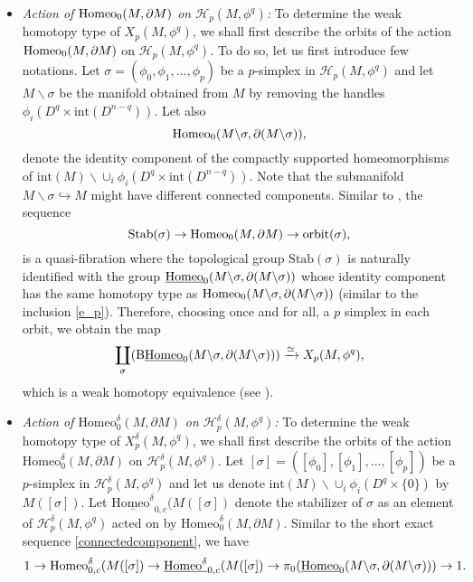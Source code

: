 \documentclass[a4paper]{amsart}
\theoremstyle{definition}
\theoremstyle{remark}
\newtheorem{rem}[thm]{Remark}
\newcommand{\tH}{\text{\textnormal{Homeo}}}
\newcommand{\BwH}{\mathrm{B}\underline{\text{\textnormal{Homeo}}}}
\newcommand{\tdH}{\text{Homeo}^{\delta}}
\numberwithin{equation}{section}
\begin{document}
\begin{itemize}[leftmargin=*]
\item \textit{Action of $\tH_0(M,\partial M)$ on $\mathcal{H}_{p}(M,\phi^q)$:}\label{action1} To determine the weak homotopy type of $X_{p}(M,\phi^q)$, we shall first describe the orbits of the action $\tH_0(M,\partial M)$ on $\mathcal{H}_{p}(M,\phi^q)$. To do so, let us first introduce few notations. Let $\sigma=(\phi_0, \phi_1, \dots, \phi_p)$ be a $p$-simplex in $\mathcal{H}_{p}(M,\phi^q)$ and let $M\backslash \sigma$ be the manifold  obtained from $M$ by removing the handles $ \phi_i(D^q\times \text{int}(D^{n-q}))$. Let also 
\[
\tH_{0}(M\backslash \sigma, \partial(M\backslash \sigma)),
\]
denote the identity component of the compactly supported homeomorphisms of $\text{int}(M)\backslash \cup_i\phi_i(D^q\times \text{int}(D^{n-q}))$. Note that the submanifold $M\backslash \sigma\hookrightarrow M$ might have different connected components. Similar to , the sequence
\[
\text{Stab}(\sigma)\to \tH_0(M,\partial M)\to \text{orbit}(\sigma),
\]
is a quasi-fibration where the topological group $\text{Stab}(\sigma)$ is naturally identified with  the group $\underline{\tH}_{0}(M\backslash \sigma, \partial(M\backslash \sigma))$ whose identity component has the same homotopy type as  $\tH_{0}(M\backslash \sigma, \partial(M\backslash \sigma))$ (similar to the inclusion \ref{e_p}). Therefore, choosing once and for all, a $p$ simplex in each orbit, we obtain the map
\[
 \coprod_{\sigma} (\BwH_{0}(M\backslash \sigma, \partial(M\backslash \sigma)))\xrightarrow{\simeq} X_{p}(M,\phi^q),
\]
which is a weak homotopy equivalence (see ).
\item \textit{Action of $\tdH_0(M,\partial M)$ on $\mathcal{H}^{\delta}_{p}(M,\phi^q)$:} \label{action2}To determine the weak homotopy type of $X^{\delta}_{p}(M,\phi^q)$, we shall first describe the orbits of the action $\tdH_0(M,\partial M)$ on $\mathcal{H}^{\delta}_{p}(M,\phi^q)$. Let $[\sigma]=([\phi_0], [\phi_1], \dots, [\phi_p])$ be a $p$-simplex in $\mathcal{H}^{\delta}_{p}(M,\phi^q)$ and let us denote $\text{int}(M)\backslash \cup_i\phi_i(D^q\times\{0\})$ by $M( [\sigma])$. Let $\underline{\tdH}_{0,c}(M([\sigma])$ denote the stabilizer of $\sigma$ as an element of $\mathcal{H}^{\delta}_{p}(M,\phi^q)$ acted on by $\tdH_0(M,\partial M)$. Similar to the short exact sequence \ref{connectedcomponent}, we have 
\[
1\to \tdH_{0,c}(M([\sigma])\to \underline{\tdH}_{0,c}(M([\sigma])\to \pi_0(\underline{\tH}_{0}(M\backslash \sigma, \partial(M\backslash \sigma)))\to 1.
\]


\end{itemize}
\end{document}
